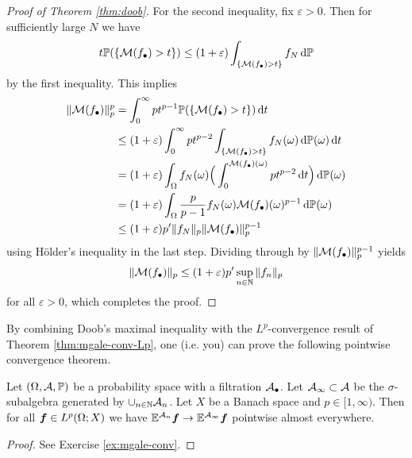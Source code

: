 \begin{proof}[Proof of Theorem \ref{thm:doob}]
  For the second inequality, fix $\varepsilon > 0$.
  Then for sufficiently large $N$ we have
  \begin{equation*}
    t\mathbb{P}(\{\mathcal{M}(f_{\bullet}) > t\}) \leq (1 + \varepsilon) \int_{\{\mathcal{M}(f_{\bullet}) > t\}} f_{N} \, \mathrm{d} \mathbb{P}
  \end{equation*}
  by the first inequality.
  This implies
  \begin{equation*}
    \begin{aligned}
      \|\mathcal{M}(f_{\bullet})\|_{p}^{p}
      &= \int_0^\infty pt^{p-1} \mathbb{P}(\{\mathcal{M}(f_{\bullet}) > t\}) \, \mathrm{d} t \\
      &\leq (1 + \varepsilon) \int_0^\infty pt^{p-2} \int_{\{\mathcal{M}(f_{\bullet}) > t\}} f_{N}(\omega) \, \mathrm{d}\mathbb{P}(\omega) \, \mathrm{d} t \\
      &= (1 + \varepsilon) \int_{\Omega} f_{N}(\omega) \Big( \int_0^{\mathcal{M}(f_{\bullet})(\omega)} pt^{p-2} \, \mathrm{d} t \Big) \, \mathrm{d}\mathbb{P}(\omega) \\
      &= (1 + \varepsilon) \int_{\Omega} \frac{p}{p-1} f_{N}(\omega) \mathcal{M}(f_{\bullet})(\omega)^{p-1} \, \mathrm{d}\mathbb{P}(\omega) \\
      &\leq (1 + \varepsilon) p' \|f_{N}\|_{p} \|\mathcal{M}(f_\bullet)\|_{p}^{p-1}
    \end{aligned}
  \end{equation*}
  using H\"older's inequality in the last step.
  Dividing through by $\|\mathcal{M}(f_{\bullet})\|_{p}^{p-1}$ yields
  \begin{equation*}
    \|\mathcal{M}(f_{\bullet})\|_{p} \leq (1 + \varepsilon) p' \sup_{n \in \mathbb{N}}\|f_{n}\|_{p}
  \end{equation*}
  for all $\varepsilon > 0$, which completes the proof.
\end{proof}

By combining Doob's maximal inequality with the $L^p$-convergence result of Theorem \ref{thm:mgale-conv-Lp}, one (i.e. you) can prove the following pointwise convergence theorem.

\begin{thm}\label{thm:mgale-pw-conv} 
  Let $(\Omega, \mathcal{A}, \mathbb{P})$ be a probability space with a filtration $\mathcal{A}_{\bullet}$.
  Let $\mathcal{A}_{\infty} \subset \mathcal{A}$ be the $\sigma$-subalgebra generated by $\cup_{n \in \mathbb{N}} \mathcal{A}_{n}$.
  Let $X$ be a Banach space and $p \in [1,\infty)$.
  Then for all $\bm{f} \in L^p(\Omega;X)$ we have $\mathbb{E}^{\mathcal{A}_{n}} \bm{f} \to \mathbb{E}^{\mathcal{A}_\infty} \bm{f}$ pointwise almost everywhere.
\end{thm}

\begin{proof}
  See Exercise \ref{ex:mgale-conv}.
\end{proof}

